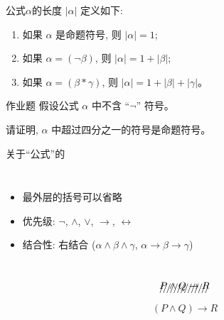 \begin{frame}{}
  \begin{definition}[公式的长度]
    公式$\alpha$的长度 $|\alpha|$ 定义如下:
    \begin{enumerate}[(1)]
      \setlength{\itemsep}{8pt}
      \item 如果 $\alpha$ 是命题符号, 则 $|\alpha| = 1$;
      \item 如果 $\alpha = (\lnot \beta)$, 则 $|\alpha| = 1 + |\beta|$;
      \item 如果 $\alpha = (\beta \ast \gamma)$, 则 $|\alpha| = 1 + |\beta| + |\gamma|$。
    \end{enumerate}
  \end{definition}

  \pause
  \vspace{0.30cm}
  \begin{exampleblock}{作业题}
    假设公式 $\alpha$ 中不含 ``$\lnot$'' 符号。

    请证明, $\alpha$ 中超过四分之一的符号是命题符号。
  \end{exampleblock}
\end{frame}

\begin{frame}{}
  \begin{center}
    关于``公式''的

    \vspace{0.60cm}
    \begin{columns}
        \begin{itemize}
          \setlength{\itemsep}{6pt}
          \item 最外层的括号可以省略
          \item 优先级: $\lnot$, $\land$, $\lor$, $\to$, $\leftrightarrow$
          \item 结合性: 右结合 ($\alpha \land \beta \land \gamma$,
            $\alpha \to \beta \to \gamma$)
        \end{itemize}
    \end{columns}

    \pause
    \vspace{1.00cm}

    \[
      \xout{P \land Q \to R}
    \]
    \[
      (P \land Q) \to R
    \]
  \end{center}
\end{frame}

